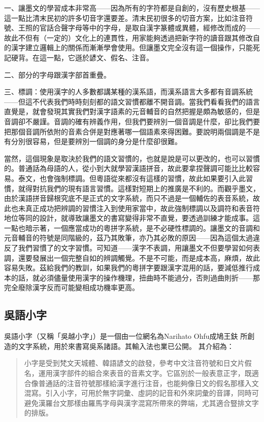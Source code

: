 \documentclass[a5paper, 12pt, openany]{book} %
\begin{document}
一、讓墨文的學習成本非常高——因為所有的字符都是自創的，沒有歷史根基——這一點比清末民初的許多切音字還要差。清末民初很多的切音方案，比如注音符號、王照的官話合聲字母等中的字母，是取自漢字篆體或異體，經修改而成的——故此不但有（一定的）文化上的連貫性，用家能夠透過把新字符的讀音跟其修改自的漢字建立邏輯上的關係而漸漸學會使用。但讓墨文完全沒有這一個操作，只能死記硬背。在這一點，它遜於諺文、假名、注音。

二、部分的字母跟漢字部首重疊。

三、標調：使用漢字的人多數都講某種的漢系語，而漢系語言大多都有音調系統——但這不代表我們時時刻刻都的語文習慣都離不開音調。當我們看看我們的語言直覺是，就會發現其實我們對漢字語素的元音輔音的自然把握是頗為敏感的，但是音調卻不嚴謹。音調的確有辨義作用，但我們要辨別一個音調是什麼，卻比我們要把那個音調所依附的音素合併是對應著哪一個語素來得困難。要說明兩個調是不是有分別很容易，但是要辨別一個調的身分是什麼卻很難。

當然，這個現象是取決於我們的語文習慣的，也就是說是可以更改的，也可以習慣的。普通話為母語的人，從小到大就學習漢語拼音，故此要拿捏聲調可能比比較容易。泰文，也會強制標調。但粵語從來都沒有這樣的習慣，故此如果要引入此習慣，就得對抗我們的現有語言習慣。這樣對短期上的推廣是不利的。而觀乎墨文，由於漢語拼音歸根究底不是正式的文字系統，而只不過是一個輔佐的表音系統，故此也未真正成功把辨調的習慣注入到使用家當中，故此強制標調以及調符和表音符地位等同的設計，就導致讓墨文的書寫變得非常不直覺，要透過訓練才能成事。這一點也暗示著，一個應當成功的粵拼字系統，是不必硬性標調的。讓墨文的音調和元音輔音的符號是同階級的，茲乃其敗筆，亦乃其必敗的原因——因為這個太過違反了我們習慣了的文字習慣。可知道——漢字不表調，用讓墨文不但要學習如何表調，還要發展出一個完整自如的辨調觸覺。不是不可能，而是成本高，麻煩，故此容易失敗。茲給我們的教訓，如果我們的粵拼字要跟漢字混用的話，要減低推行成本的話，就必須儘量使用漢字的操作機理，扭曲時不能過分，否則過曲則折——那完全廢除漢字反而可能變相成功機率更高。

\subsection{吳語小字}

吳語小字（又稱「吳越小字」）是一個由一位網名為Narihato Ohfu成鳩王鈇 所創造的文字系統，用於來書寫吳系諸語。其輸入法也業已公開。 其介紹為：

\begin{quotation}
小字是受到梵文天城體、韓語諺文的啟發，參考中文注音符號和日文片假名，運用漢字部件的組合來表音的音素文字。它區別於一般表意正字，既適合像普通話的注音符號那樣給漢字進行注音，也能夠像日文的假名那樣入文混寫。引入小字，可用於無字詞彙、虛詞的記音和外來詞彙的音譯，同時可避免漢羅台文那樣由羅馬字母與漢字混寫所帶來的弊端，尤其適合豎排文字的排版。
\end{quotation}
\end{document}
